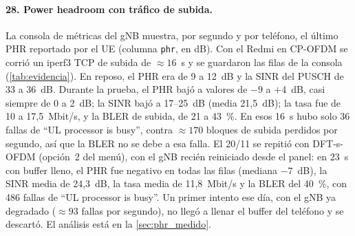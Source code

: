 \paragraph{28. Power headroom con tráfico de subida.} La consola de métricas del gNB muestra, por segundo y por teléfono, el último PHR reportado por el UE (columna \texttt{phr}, en dB). Con el Redmi en CP-OFDM se corrió un iperf3 TCP de subida de $\approx 16$~s y se guardaron las filas de la consola (\cref{tab:evidencia}). En reposo, el PHR era de 9 a 12~dB y la SINR del PUSCH de 33 a 36~dB. Durante la prueba, el PHR bajó a valores de $-9$ a $+4$~dB, casi siempre de 0 a 2~dB; la SINR bajó a 17--25~dB (media 21,5~dB); la tasa fue de 10 a 17,5~Mbit/s, y la BLER de subida, de 21 a 43~\%. En esos 16~s hubo solo 36 fallas de ``UL processor is busy'', contra $\approx 170$ bloques de subida perdidos por segundo, así que la BLER no se debe a esa falla. El 20/11 se repitió con DFT-s-OFDM (opción~2 del menú), con el gNB recién reiniciado desde el panel: en 23~s con buffer lleno, el PHR fue negativo en todas las filas (mediana $-7$~dB), la SINR media de 24,3~dB, la tasa media de 11,8~Mbit/s y la BLER del 40~\%, con 486 fallas de ``UL processor is busy''. Un primer intento ese día, con el gNB ya degradado ($\approx 93$ fallas por segundo), no llegó a llenar el buffer del teléfono y se descartó. El análisis está en la \cref{sec:phr_medido}.

